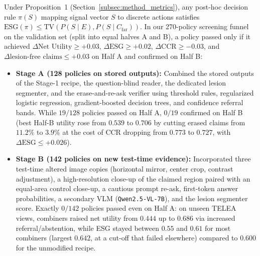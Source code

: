 \documentclass[5p,times,twocolumn,authoryear]{elsarticle}
\begin{document}
Under Proposition~1 (Section~\ref{subsec:method_metrics}), any post-hoc decision rule $\pi(S)$ mapping signal vector $S$ to discrete actions satisfies $\text{ESG}(\pi) \le \text{TV}(P(S \mid E), P(S \mid C_{\text{far}}))$. In our 270-policy screening funnel on the validation set (split into equal halves A and B), a policy passed only if it achieved $\Delta\text{Net Utility} \ge +0.03$, $\Delta\text{ESG} \ge +0.02$, $\Delta\text{CCR} \ge -0.03$, and $\Delta\text{lesion-free claims} \le +0.03$ on Half A and confirmed on Half B:
\begin{itemize}[leftmargin=*,nosep]
    \item \textbf{Stage A (128 policies on stored outputs):} Combined the stored outputs of the Stage-1 recipe, the question-blind reader, the dedicated lesion segmenter, and the erase-and-re-ask verifier using threshold rules, regularized logistic regression, gradient-boosted decision trees, and confidence referral bands. While $19/128$ policies passed on Half A, $0/19$ confirmed on Half B (best Half-B utility rose from $0.539$ to $0.706$ by cutting erased claims from $11.2\%$ to $3.9\%$ at the cost of CCR dropping from $0.773$ to $0.727$, with $\Delta\text{ESG} \le +0.026$).
    \item \textbf{Stage B (142 policies on new test-time evidence):} Incorporated three test-time altered image copies (horizontal mirror, center crop, contrast adjustment), a high-resolution close-up of the claimed region paired with an equal-area control close-up, a cautious prompt re-ask, first-token answer probabilities, a secondary VLM (\texttt{Qwen2.5-VL-7B}), and the lesion segmenter score. Exactly $0/142$ policies passed even on Half A: on unseen TELEA views, combiners raised net utility from $0.444$ up to $0.686$ via increased referral/abstention, while ESG stayed between $0.55$ and $0.61$ for most combiners (largest $0.642$, at a cut-off that failed elsewhere) compared to $0.600$ for the unmodified recipe.
\end{itemize}
\end{document}
